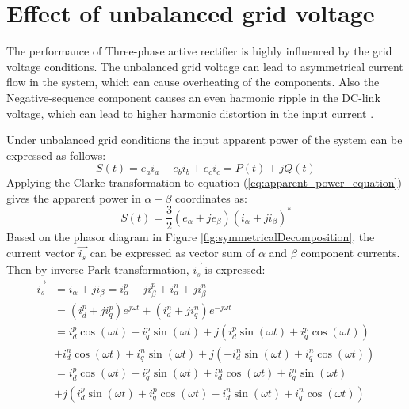 \section{Effect of unbalanced grid voltage}
The performance of Three-phase active rectifier is highly influenced by the grid voltage conditions.
The unbalanced grid voltage can lead to asymmetrical current flow in the system, which can
cause overheating of the components. Also the Negative-sequence component causes an even
harmonic ripple in the DC-link voltage, which can lead to higher harmonic distortion in the
input current \cite{song1999,1022376Lipo, Suh2002ANC}.\par
Under unbalanced grid conditions the input apparent power of the system can be expressed as
follows:
\begin{equation}
    S(t) = e_a i_a + e_b i_b + e_c i_c = P(t) + jQ(t)
    \label{eq:apparent_power_equation}
\end{equation}
Applying the Clarke transformation to equation (\ref{eq:apparent_power_equation}) gives the apparent
power in $\alpha-\beta$ coordinates as:
\begin{equation}
    S(t) = \frac{3}{2}(e_{\alpha} + je_{\beta})(i_{\alpha} + ji_{\beta})^{*}
    \label{eq:apparent_power_alpha_beta}
\end{equation}
Based on the phasor diagram in Figure \ref{fig:symmetricalDecomposition}, the current vector $\vec{i_{s}}$ can be expressed as vector sum of
$\alpha$ and $\beta$ component currents. Then by inverse Park transformation, $\vec{i_{s}}$ is expressed:
\begin{equation}
    \begin{split}
        \vec{i_{s}} &= i_{\alpha} + ji_{\beta} = i_{\alpha}^{p} + ji_{\beta}^{p} + i_{\alpha}^{n} + ji_{\beta}^{n} \\
        &= (i_{d}^{p} + ji_{q}^{p})e^{j\omega t} + (i_{d}^{n} + ji_{q}^{n})e^{-j\omega t}\\
        &= i_{d}^{p} \cos(\omega t) - i_{q}^{p} \sin(\omega t) + j(i_{d}^{p} \sin(\omega t) + i_{q}^{p} \cos(\omega t))\\
        &+ i_{d}^{n} \cos(\omega t) + i_{q}^{n} \sin(\omega t) + j(-i_{d}^{n} \sin(\omega t) + i_{q}^{n} \cos(\omega t))\\
        &= i_{d}^{p} \cos(\omega t) - i_{q}^{p} \sin(\omega t) + i_{d}^{n} \cos(\omega t) + i_{q}^{n} \sin(\omega t)\\
        &+ j(i_{d}^{p} \sin(\omega t) + i_{q}^{p} \cos(\omega t) - i_{d}^{n} \sin(\omega t) + i_{q}^{n} \cos(\omega t))
    \end{split}
    \label{eq:current_phasor}
\end{equation}
